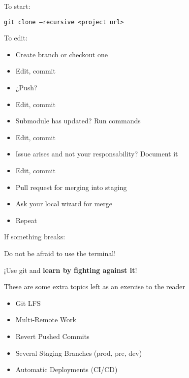 \documentclass[12pt,a4paper]{article}
\begin{document}
\begin{enumerate}
		\vspace{1cm}
		
		To start:
		
		\texttt{git clone --recursive <project url>}
		
		To edit:
		\begin{itemize}
			\item Create branch or checkout one
			\item Edit, commit
			\item ¿Push?
			\item Edit, commit
			\item Submodule has updated? Run commands
			\item Edit, commit
			\item Issue arises and not your responsability? Document it
			\item Edit, commit
			\item Pull request for merging into staging
			\item Ask your local wizard for merge
			\item Repeat
		\end{itemize}
		
		If something breaks:
		
		Do not be afraid to use the terminal!
		
		\vspace{3cm}
		¡Use git and \textbf{learn by fighting against it}!
		
		\vspace{2cm}
		These are some extra topics left as an exercise to the reader
		\begin{itemize} 
			\item Git LFS
			\item Multi-Remote Work
			\item Revert Pushed Commits
			\item Several Staging Branches (prod, pre, dev)
			\item Automatic Deployments (CI/CD)
		\end{itemize}
		
		
		
	\end{enumerate}
	
	
\end{document}
